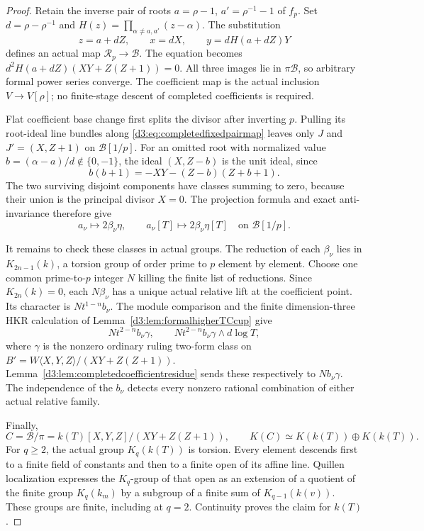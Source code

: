 \begin{proof}
Retain the inverse pair of roots
$a=\rho-1$, $a'=\rho^{-1}-1$ of $f_p$.
Set $d=\rho-\rho^{-1}$ and
$H(z)=\prod_{\alpha\ne a,a'}(z-\alpha)$.
The substitution
\begin{equation}\label{d3:eq:completedfixedpairmap}
 z=a+dZ,\qquad x=dX,\qquad y=dH(a+dZ)Y
\end{equation}
defines an actual map $\mathcal R_p\to\mathcal B$.
The equation becomes $d^2H(a+dZ)(XY+Z(Z+1))=0$.
All three images lie in $\pi\mathcal B$, so arbitrary formal
power series converge. The coefficient map is the actual
inclusion $V\to V[\rho]$; no finite-stage descent of completed
coefficients is required.

Flat coefficient base change first splits the divisor after
inverting $p$. Pulling its root-ideal line bundles along
\eqref{d3:eq:completedfixedpairmap} leaves only $J$ and
$J'=(X,Z+1)$ on $\mathcal B[1/p]$.
For an omitted root with normalized value
$b=(\alpha-a)/d\notin\{0,-1\}$, the ideal
$(X,Z-b)$ is the unit ideal, since
\[
 b(b+1)=-XY-(Z-b)(Z+b+1).
\]
The two surviving disjoint components have classes summing
to zero, because their union is the principal divisor $X=0$.
The projection formula and exact anti-invariance therefore give
\begin{equation}\label{d3:eq:completedfixedimages}
 a_\nu\longmapsto2\beta_\nu\eta,\qquad
 a_\nu[T]\longmapsto2\beta_\nu\eta[T]
 \quad\text{on }\mathcal B[1/p].
\end{equation}

It remains to check these classes in actual groups.
The reduction of each $\beta_\nu$ lies in
$K_{2n-1}(k)$, a torsion group of order prime to $p$
element by element. Choose one common prime-to-$p$ integer
$N$ killing the finite list of reductions.
Since $K_{2n}(k)=0$, each $N\beta_\nu$ has a unique actual
relative lift at the coefficient point.
Its character is $Nt^{1-n}b_\nu$.
The module comparison and the finite dimension-three HKR
calculation of Lemma~\ref{d3:lem:formalhigherTCcup} give
\[
 Nt^{2-n}b_\nu\gamma,\qquad
 Nt^{2-n}b_\nu\gamma\wedge d\log T,
\]
where $\gamma$ is the nonzero ordinary ruling two-form class
on $B'=W\langle X,Y,Z\rangle/(XY+Z(Z+1))$.
Lemma~\ref{d3:lem:completedcoefficientresidue} sends these
respectively to $Nb_\nu\gamma$.
The independence of the $b_\nu$ detects every nonzero
rational combination of either actual relative family.

Finally,
\[
 C=\mathcal B/\pi
   =k(T)[X,Y,Z]/(XY+Z(Z+1)),\qquad
 K(C)\simeq K(k(T))\oplus K(k(T)).
\]
For $q\geq2$, the actual group $K_q(k(T))$ is torsion.
Every element descends first to a finite field of constants
and then to a finite open of its affine line.
Quillen localization expresses the $K_q$-group of that open
as an extension of a quotient of the finite group $K_q(k_m)$
by a subgroup of a finite sum of $K_{q-1}(k(v))$.
These groups are finite, including at $q=2$.
Continuity proves the claim for $k(T)$.


\end{proof}
